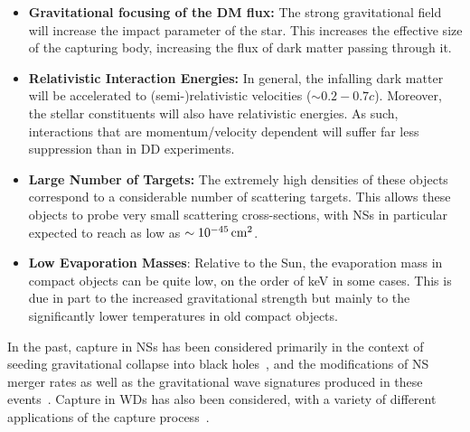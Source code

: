 \begin{itemize}
\item \textbf{Gravitational focusing of the DM flux:} The strong gravitational field will increase the impact parameter of the star. This increases the effective size of the capturing body, increasing the flux of dark matter passing through it. 

\item \textbf{Relativistic Interaction Energies:} In general, the infalling dark matter will be accelerated to (semi-)relativistic velocities ($\sim 0.2 - 0.7 c$). Moreover, the stellar constituents will also have relativistic energies. As such, interactions that are momentum/velocity dependent will suffer far less suppression than in DD experiments. 

\item \textbf{Large Number of Targets:} The extremely high densities of these objects correspond to a considerable number of scattering targets. This allows these objects to probe very small scattering cross-sections, with NSs in particular expected to reach as low as $\sim 10^ {-45}{\rm \,cm}^2$. 

\item \textbf{Low Evaporation Masses}: Relative to the Sun, the evaporation mass in compact objects can be quite low, on the order of keV in some cases. This is due in part to the increased gravitational strength but mainly to the significantly lower temperatures in old compact objects. 
\end{itemize}

In the past, capture in NSs has been considered primarily in the context of seeding gravitational collapse into black holes~\cite{McDermott:2011jp_ConstraintsScalarAsymmetric, Kouvaris:2011fi_ExcludingLightAsymmetric,Guver:2012ba_may_Capturedarkmatter, Garani:2018kkd_may_NewAnalysisNeutron, Bramante:2013nma_jan_Boundsselfinteractingfermion, Bertoni:2013bsa_dec_DarkMatterThermalization, Bell:2013xk_jun_Realisticneutronstar}, and the modifications of NS merger rates as well as the gravitational wave signatures produced in these events~\cite{Bramante:2017ulk_mar_SearchingDarkMatter, Ellis:2017jgp_jun_SearchDarkMatter, Ellis:2018bkr_jun_DarkMatterEffects, Nelson:2018xtr_jul_Darkhalosneutron}. Capture in WDs has also been considered, with a variety of different applications of the capture process~\cite{Steigerwald:2019efv_dec_DarkMatterThermonuclear, Panotopoulos:2020kuo_jun_Constraintslightdark, McCullough:2010ai_CaptureInelasticDark, Hooper:2010es_InelasticDarkMatter, Bramante:2015cua_sep_Darkmatterignition, Bertone:2007ae_CompactStarsDark}. 

